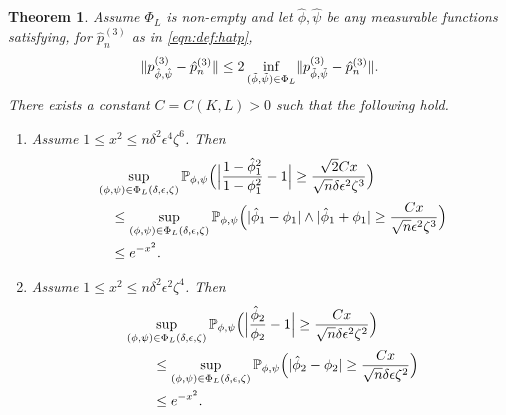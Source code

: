 \documentclass[journal]{IEEEtran}
\newtheorem{theorem}{Theorem}
\newtheorem{remark}{Remark}
\newcommand{\1}{\boldsymbol{1}}
\newcommand{\PP}{\mathbb{P}}
\DeclarePairedDelimiter{\brackets}{(}{)}
\DeclarePairedDelimiter{\norm}{\lVert}{\rVert}
\DeclarePairedDelimiter{\abs}{\lvert}{\rvert}
\newcommand{\RR}{\mathbb{R}}
\begin{document}
	\begin{theorem}\label{thm:minimax-upper-bound}
		Assume $\Phi_L$ is non-empty and let $\hat{\phi},\hat{\psi}$ be any measurable functions satisfying, for $\hat{p}^{(3)}_n$ as in \cref{eqn:def:hatp}, \begin{equation*}\label{eqn:minimum-distance} \norm{ p^{(3)}_{\hat{\phi},\hat{\psi}}-\hat{p}_n^{(3)}}\leq 2\inf_{(\tilde{\phi},\tilde{\psi})\in\Phi_L} \norm{p^{(3)}_{\tilde{\phi},\tilde{\psi}}-\hat{p}^{(3)}_n}.
		\end{equation*}
		There exists a constant $C=C(K,L)>0$ such that the following hold.
		\begin{enumerate}
                  \item\label{item:mub:phi1} Assume $1\leq x^2\leq n\delta^2 \epsilon^4\zeta^6$. Then
                  \begin{align*}
                    &\sup_{(\phi,\psi)\in\Phi_L(\delta,\epsilon, \zeta)}\PP_{\phi,\psi}\brackets[\Big]{\abs[\Big]{\frac{1-\hat{\phi}_1^2}{1-\phi_1^2}-1}
                    \geq%
                      \frac{\sqrt{2}Cx }{\sqrt{n}\delta\epsilon^2\zeta^3}}\\ %
                    &\quad\leq \sup_{(\phi,\psi)\in\Phi_L(\delta,\epsilon, \zeta)}\PP_{\phi,\psi}\brackets[\Big]{\abs{\hat{\phi}_1 - \phi_1} \wedge\abs{\hat{\phi}_1+\phi_1} \geq  \frac{Cx }{\sqrt{n}\epsilon^2\zeta^3}}\\%
                    &\quad%
                      \leq e^{-x^2}.
                  \end{align*}

                  
                  \item\label{item:mub:phi2} Assume $1\leq x^2\leq n\delta^2\epsilon^2\zeta^4$. Then
                  \begin{align*}
                    &\sup_{(\phi,\psi)\in\Phi_L(\delta,\epsilon, \zeta)}\PP_{\phi,\psi}\brackets[\Big]{\abs[\Big]{\frac{\hat{\phi}_2}{\phi_2} - 1}	\geq  \frac{Cx }{\sqrt{n}\delta \epsilon^2 \zeta^2}}\\
                    &\qquad%
                    \leq \sup_{(\phi,\psi)\in\Phi_L(\delta,\epsilon, \zeta)}\PP_{\phi,\psi}\brackets[\Big]{\abs{\hat{\phi}_2 - \phi_2}	\geq  \frac{Cx }{\sqrt{n}\delta\epsilon \zeta^2}}\\%
                    &\qquad%
				\leq e^{-x^2}.
                  \end{align*}


\end{enumerate}
\end{theorem}
\end{document}
